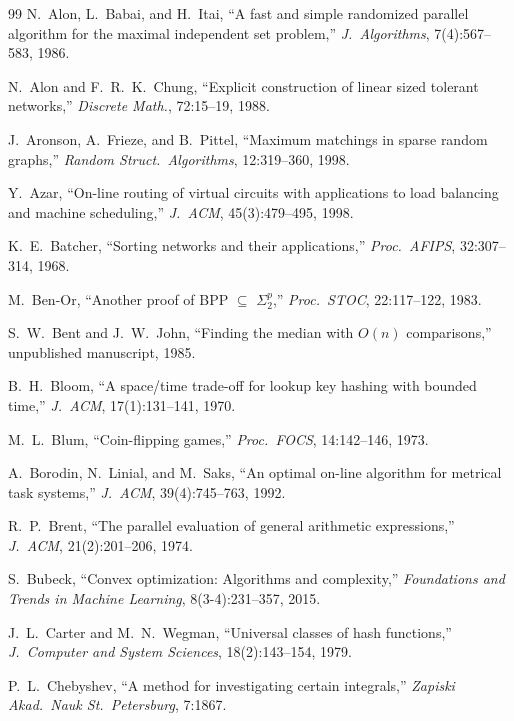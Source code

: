 \documentclass[twoside,12pt]{book}
\theoremstyle{plain}
\theoremstyle{definition}
\theoremstyle{remark}
\begin{document}
\begin{thebibliography}{99}
N.~Alon, L.~Babai, and H.~Itai,
``A fast and simple randomized parallel algorithm for the maximal independent set problem,''
\textit{J.~Algorithms}, 7(4):567--583, 1986.

N.~Alon and F.~R.~K.~Chung,
``Explicit construction of linear sized tolerant networks,''
\textit{Discrete Math.}, 72:15--19, 1988.

J.~Aronson, A.~Frieze, and B.~Pittel,
``Maximum matchings in sparse random graphs,''
\textit{Random Struct.~Algorithms}, 12:319--360, 1998.

Y.~Azar,
``On-line routing of virtual circuits with applications to load balancing and machine scheduling,''
\textit{J.~ACM}, 45(3):479--495, 1998.

K.~E.~Batcher,
``Sorting networks and their applications,''
\textit{Proc.~AFIPS}, 32:307--314, 1968.

M.~Ben-Or,
``Another proof of BPP $\subseteq$ $\Sigma_2^p$,''
\textit{Proc.~STOC}, 22:117--122, 1983.

S.~W.~Bent and J.~W.~John,
``Finding the median with $O(n)$ comparisons,''
unpublished manuscript, 1985.

B.~H.~Bloom,
``A space/time trade-off for lookup key hashing with bounded time,''
\textit{J.~ACM}, 17(1):131--141, 1970.

M.~L.~Blum,
``Coin-flipping games,''
\textit{Proc.~FOCS}, 14:142--146, 1973.

A.~Borodin, N.~Linial, and M.~Saks,
``An optimal on-line algorithm for metrical task systems,''
\textit{J.~ACM}, 39(4):745--763, 1992.

R.~P.~Brent,
``The parallel evaluation of general arithmetic expressions,''
\textit{J.~ACM}, 21(2):201--206, 1974.

S.~Bubeck,
``Convex optimization: Algorithms and complexity,''
\textit{Foundations and Trends in Machine Learning}, 8(3-4):231--357, 2015.

J.~L.~Carter and M.~N.~Wegman,
``Universal classes of hash functions,''
\textit{J.~Computer and System Sciences}, 18(2):143--154, 1979.

P.~L.~Chebyshev,
``A method for investigating certain integrals,''
\textit{Zapiski Akad.~Nauk St.~Petersburg}, 7:1867.


\end{thebibliography}
\end{document}
